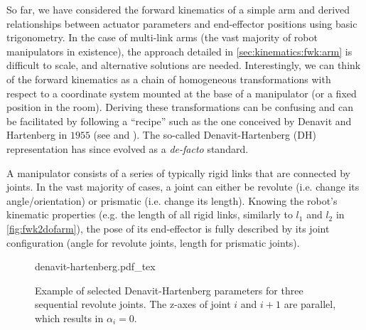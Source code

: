 So far, we have considered the forward kinematics of a simple arm and derived relationships between actuator parameters and end-effector positions using basic trigonometry.
In the case of multi-link arms (the vast majority of robot manipulators in existence), the approach detailed in \cref{sec:kinematics:fwk:arm} is difficult to scale, and alternative solutions are needed.
Interestingly, we can think of the forward kinematics as a chain of homogeneous transformations with respect to a coordinate system mounted at the base of a manipulator (or a fixed position in the room).
Deriving these transformations can be confusing and can be facilitated by following a ``recipe'' such as the one conceived by Denavit and Hartenberg in $1955$ (see \cite{hartenberg1955kinematic} and \cite{craig2009introduction}).
The so-called Denavit-Hartenberg (DH) representation has since evolved as a \textsl{de-facto} standard.

A manipulator consists of a series of typically rigid links that are connected by joints.
In the vast majority of cases, a joint can either be revolute (i.e. change its angle/orientation) or prismatic (i.e. change its length).
Knowing the robot's kinematic properties (e.g. the length of all rigid links, similarly to $l_1$ and $l_2$ in \cref{fig:fwk2dofarm}), the pose of its end-effector is fully described by its joint configuration (angle for revolute joints, length for prismatic joints).



\begin{figure}[!t]
    \centering
    \def\svgwidth{\textwidth}
    {denavit-hartenberg.pdf_tex}
    \caption{Example of selected Denavit-Hartenberg parameters for three sequential revolute joints. The z-axes of joint $i$ and $i+1$ are parallel, which results in $\alpha_i = 0$.}
    \label{fig:denavit}
\end{figure}

